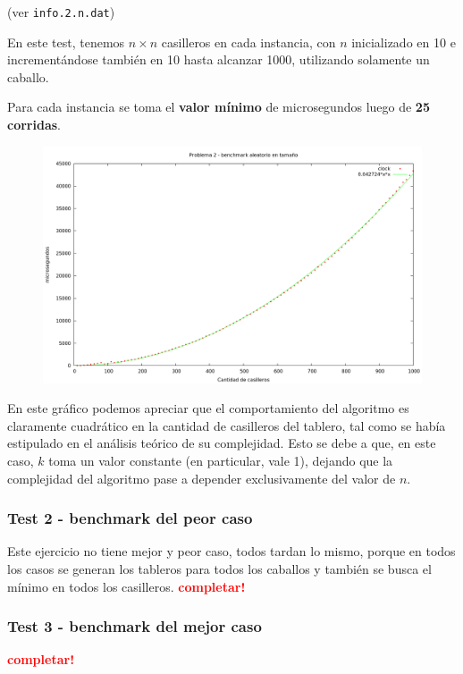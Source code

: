(ver \verb|info.2.n.dat|) \medskip

En este test, tenemos $n \times n$ casilleros en cada instancia, con $n$
inicializado en 10 e incrementándose también en 10 hasta alcanzar 1000,
utilizando solamente un caballo.

Para cada instancia se toma el \textbf{valor mínimo} de microsegundos luego de
\textbf{25 corridas}.

\vspace*{0.5cm}

\begin{figure}[h]
  \begin{center}
    \includegraphics[scale=0.35]{imagenes/grafico-2-n.png}
  \end{center}
\end{figure}

\vspace*{0.5cm}

En este gráfico podemos apreciar que el comportamiento del algoritmo es
claramente cuadrático en la cantidad de casilleros del tablero, tal como se
había estipulado en el análisis teórico de su complejidad. Esto se debe a que,
en este caso, $k$ toma un valor constante (en particular, vale 1), dejando que
la complejidad del algoritmo pase a depender exclusivamente del valor de $n$.


\newpage
\subsubsection{Test 2 - benchmark del peor caso}

Este ejercicio no tiene mejor y peor caso, todos tardan lo mismo,
porque en todos los casos se generan los tableros para todos los caballos
y también se busca el mínimo en todos los casilleros.
\textcolor{red}{\textbf{completar!}}


\newpage
\subsubsection{Test 3 - benchmark del mejor caso}

\textcolor{red}{\textbf{completar!}}

